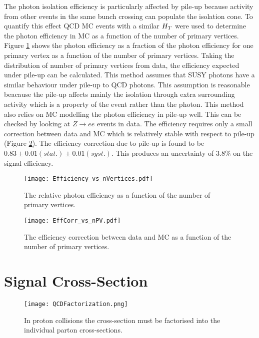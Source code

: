 The photon isolation efficiency is particularly affected by pile-up because
activity from other events in the same bunch crossing can populate the isolation
cone. To quantify this effect QCD MC events with a similar $H_{T}$ were used to
determine the photon efficiency in MC as a function of the number of primary
vertices. Figure \ref{fig:Efficiency_vs_nVertices} shows the photon efficiency
as a fraction of the photon efficiency for one primary vertex as a function of 
the number of primary vertices. Taking the distribution of number of primary 
vertices from data, the efficiency expected under pile-up can be calculated. 
This method assumes that SUSY photons have a similar behaviour under pile-up to 
QCD photons. This assumption is reasonable beacause the pile-up affects mainly 
the isolation through extra surrounding activity which is a property of the 
event rather than the photon. This method also relies on MC modelling the 
photon efficiency in pile-up well. This can be checked by looking at
$Z\rightarrow ee$ events in data. The efficiency requires only a small 
correction between data and MC which is relatively stable with respect to 
pile-up (Figure \ref{fig:EffCorr_vs_nPV}). The efficiency correction due to 
pile-up is found to be $0.83\pm0.01(stat.)\pm0.01(syst.)$. This produces an 
uncertainty of $3.8\unit{\%}$ on the signal efficiency.

\begin{figure}
\begin{center}
\texttt{[image: Efficiency\_vs\_nVertices.pdf]}
\end{center}
\caption{The relative photon efficiency as a function of the number of primary 
vertices.}
\label{fig:Efficiency_vs_nVertices}
\end{figure}

\begin{figure}
\begin{center}
\texttt{[image: EffCorr\_vs\_nPV.pdf]}
\end{center}
\caption{The efficiency correction between data and MC as a function of the
number of primary vertices.}
\label{fig:EffCorr_vs_nPV}
\end{figure}

\section{Signal Cross-Section}
\label{sec:xsec}

\begin{figure}
\begin{center}
\texttt{[image: QCDFactorization.png]}
\end{center}
\caption{In proton collisions the cross-section must be factorised into the 
individual parton cross-sections.}
\label{fig:QCDFactorization}
\end{figure}

